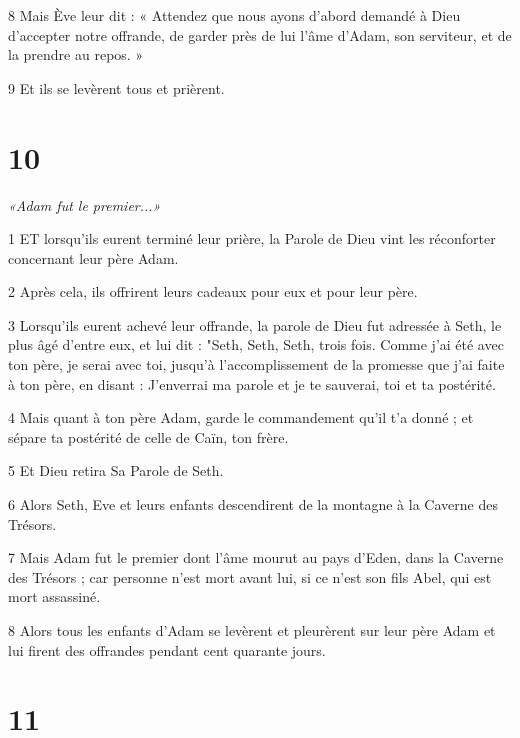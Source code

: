 \par 8 Mais Ève leur dit : « Attendez que nous ayons d'abord demandé à Dieu d'accepter notre offrande, de garder près de lui l'âme d'Adam, son serviteur, et de la prendre au repos. »

\par 9 Et ils se levèrent tous et prièrent.

\chapter{10}

\par \textit{«Adam fut le premier...»}

\par 1 ET lorsqu'ils eurent terminé leur prière, la Parole de Dieu vint les réconforter concernant leur père Adam.

\par 2 Après cela, ils offrirent leurs cadeaux pour eux et pour leur père.

\par 3 Lorsqu'ils eurent achevé leur offrande, la parole de Dieu fut adressée à Seth, le plus âgé d'entre eux, et lui dit : "Seth, Seth, Seth, trois fois. Comme j'ai été avec ton père, je serai avec toi, jusqu'à l'accomplissement de la promesse que j'ai faite à ton père, en disant : J'enverrai ma parole et je te sauverai, toi et ta postérité.

\par 4 Mais quant à ton père Adam, garde le commandement qu'il t'a donné ; et sépare ta postérité de celle de Caïn, ton frère.

\par 5 Et Dieu retira Sa Parole de Seth.

\par 6 Alors Seth, Eve et leurs enfants descendirent de la montagne à la Caverne des Trésors.

\par 7 Mais Adam fut le premier dont l'âme mourut au pays d'Eden, dans la Caverne des Trésors ; car personne n'est mort avant lui, si ce n'est son fils Abel, qui est mort assassiné.

\par 8 Alors tous les enfants d'Adam se levèrent et pleurèrent sur leur père Adam et lui firent des offrandes pendant cent quarante jours.

\chapter{11}


